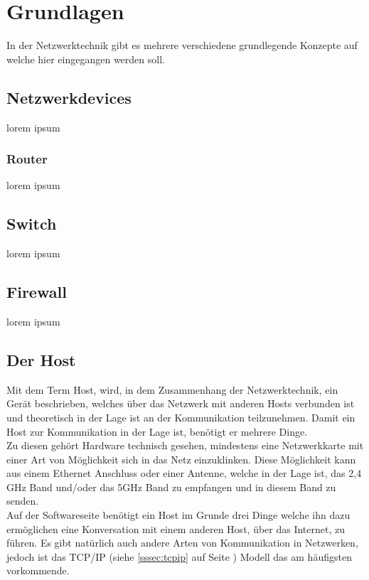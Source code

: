 \documentclass[12pt,a4paper]{report}
\begin{document}
\section{Grundlagen}
In der Netzwerktechnik gibt es mehrere verschiedene grundlegende Konzepte auf welche hier eingegangen werden soll.
\subsection{Netzwerkdevices}
lorem ipsum
\subsubsection{Router}
lorem ipsum
\subsection{Switch}
lorem ipsum
\subsection{Firewall}
lorem ipsum 
\subsection{Der Host}
Mit dem Term \glqq Host\grqq , wird, in dem Zusammenhang der Netzwerktechnik, ein Gerät beschrieben, welches über das Netzwerk mit anderen Hosts verbunden ist und theoretisch in der Lage ist an der Kommunikation teilzunehmen. Damit ein Host zur Kommunikation in der Lage ist, benötigt er mehrere Dinge.\\
Zu diesen gehört Hardware technisch gesehen, mindestens eine Netzwerkkarte mit einer Art von Möglichkeit sich in das Netz einzuklinken. Diese Möglichkeit kann aus einem Ethernet Anschluss oder einer Antenne, welche in der Lage ist, das 2,4 GHz Band und/oder das 5GHz Band zu empfangen und in diesem Band zu senden.\\
Auf der Softwareseite benötigt ein Host im Grunde drei Dinge welche ihn dazu ermöglichen eine Konversation mit einem anderen Host, über das Internet, zu führen. Es gibt natürlich auch andere Arten von Kommunikation in Netzwerken, jedoch ist das TCP/IP (siehe \ref{sssec:tcpip} auf Seite \pageref{sssec:tcpip}) Modell das am häufigsten vorkommende. 
\end{document}
